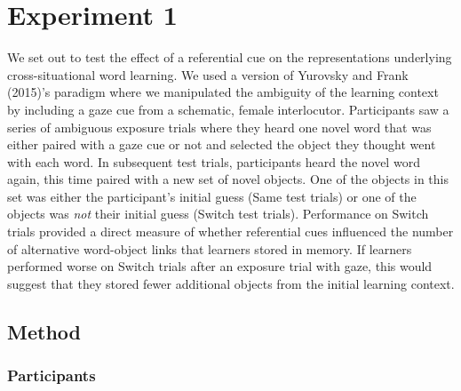 \documentclass[oneside]{report}
\begin{document}
\section{Experiment 1}\label{experiment-1}

We set out to test the effect of a referential cue on the
representations underlying cross-situational word learning. We used a
version of Yurovsky and Frank (2015)'s paradigm where we manipulated the
ambiguity of the learning context by including a gaze cue from a
schematic, female interlocutor. Participants saw a series of ambiguous
exposure trials where they heard one novel word that was either paired
with a gaze cue or not and selected the object they thought went with
each word. In subsequent test trials, participants heard the novel word
again, this time paired with a new set of novel objects. One of the
objects in this set was either the participant's initial guess (Same
test trials) or one of the objects was \emph{not} their initial guess
(Switch test trials). Performance on Switch trials provided a direct
measure of whether referential cues influenced the number of alternative
word-object links that learners stored in memory. If learners performed
worse on Switch trials after an exposure trial with gaze, this would
suggest that they stored fewer additional objects from the initial
learning context.

\subsection{Method}\label{method}

\subsubsection{Participants}\label{participants}
\end{document}
